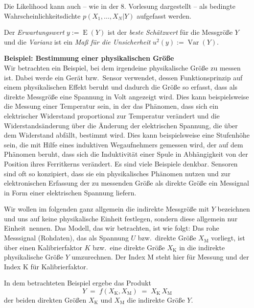 Die Likelihood kann auch -- wie in der 8. Vorlesung dargestellt -- als bedingte Wahrscheinlichkeitsdichte $p(X_1,\ldots,X_N|Y)$ aufgefasst werden.

Der \textsl{Erwartungswert} $y := \operatorname{E}(Y)$ ist der \textsl{beste Schätzwert} für die Messgröße $Y$ und die \textsl{Varianz} ist ein
\textsl{Maß für die Unsicherheit} $u^2(y) := \operatorname{Var}(Y)$.

\textbf{Beispiel: Bestimmung einer physikalischen Größe}\\
Wir betrachten ein Beispiel, bei dem irgendeine physikalische Größe zu messen ist.
Dabei werde ein Gerät bzw.\ Sensor verwendet, dessen Funktionsprinzip auf einem
physikalischen Effekt beruht und dadurch die Größe so erfasst,
dass als direkte Messgröße eine Spannung in Volt angezeigt wird. Dies kann beispielsweise
die Messung einer Temperatur sein, in der das Phänomen, dass sich ein elektrischer
Widerstand proportional zur Temperatur verändert und die Widerstandsänderung über die
Änderung der elektrischen Spannung, die über dem Widerstand abfällt, bestimmt wird.
Dies kann beispielsweise eine Stufenhöhe sein, die mit Hilfe eines induktiven Wegaufnehmers
gemessen wird, der auf dem Phänomen beruht, dass sich die Induktivität einer Spule in Abhängigkeit
von der  Position ihres Ferritkerns verändert. Es sind viele Beispiele denkbar. Sensoren
sind oft so konzipiert, dass sie ein physikalisches Phänomen nutzen und zur elektronischen
Erfassung der zu messenden Größe als direkte Größe ein Messignal in Form einer elektrischen
Spannung liefern.

Wir wollen im folgenden ganz allgemein die indirekte Messgröße mit $Y$
bezeichnen und uns auf keine physikalische Einheit festlegen, sondern diese allgemein nur
\glqq Einheit\grqq ~nennen. Das Modell, das wir betrachten, ist wie folgt: Das rohe Messsignal (Rohdaten),
das als Spannung $U$ bzw.\ direkte Größe $X_\mathrm{M}$ vorliegt, ist über
einen Kalibrierfaktor $K$ bzw.\ eine direkte Größe $X_\mathrm{K}$
in die indirekte physikalische Größe $Y$ umzurechnen.
Der Index M steht hier für Messung und der Index K für Kalibrierfaktor.

In dem betrachteten Beispiel
ergebe das Produkt
\begin{equation}
Y \; = \; f(X_\mathrm{K}, X_\mathrm{M})  \; = \; X_\mathrm{K} \, X_\mathrm{M}
\end{equation}
der beiden direkten Größen $X_\mathrm{K}$ und $X_\mathrm{M}$ die indirekte Größe $Y$.

